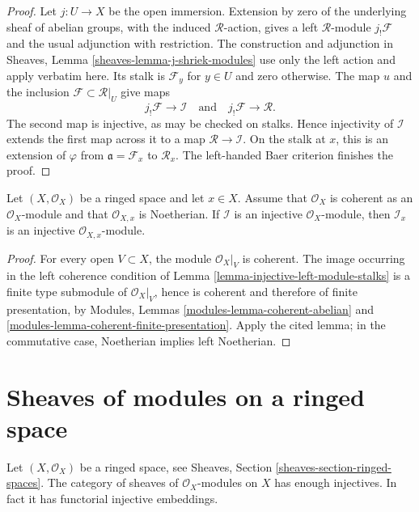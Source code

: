 \begin{proof}
Let $j : U \to X$ be the open immersion. Extension by zero of the underlying
sheaf of abelian groups, with the induced $\mathcal{R}$-action, gives a left
$\mathcal{R}$-module $j_!\mathcal{F}$ and the usual adjunction with
restriction. The construction and adjunction in Sheaves, Lemma
\ref{sheaves-lemma-j-shriek-modules} use only the left action and apply
verbatim here. Its stalk is $\mathcal{F}_y$ for $y \in U$ and zero otherwise.
The map $u$ and the inclusion $\mathcal{F} \subset \mathcal{R}|_U$ give
maps
$$
j_!\mathcal{F} \longrightarrow \mathcal{I}
\quad\text{and}\quad
j_!\mathcal{F} \longrightarrow \mathcal{R}.
$$
The second map is injective, as may be checked on stalks. Hence injectivity
of $\mathcal{I}$ extends the first map across it to a map
$\mathcal{R} \to \mathcal{I}$. On the stalk at $x$, this is an extension of
$\varphi$ from $\mathfrak a=\mathcal{F}_x$ to $\mathcal{R}_x$. The
left-handed Baer criterion finishes the proof.
\end{proof}

\begin{lemma}
\label{lemma-injective-module-stalks}
Let $(X, \mathcal{O}_X)$ be a ringed space and let $x \in X$.
Assume that $\mathcal{O}_X$ is coherent as an $\mathcal{O}_X$-module
and that $\mathcal{O}_{X, x}$ is Noetherian.
If $\mathcal{I}$ is an injective $\mathcal{O}_X$-module, then
$\mathcal{I}_x$ is an injective $\mathcal{O}_{X, x}$-module.
\end{lemma}

\begin{proof}
For every open $V \subset X$, the module $\mathcal{O}_X|_V$ is coherent. The
image occurring in the left coherence condition of Lemma
\ref{lemma-injective-left-module-stalks} is a finite type submodule of
$\mathcal{O}_X|_V$, hence is coherent and therefore of finite presentation,
by Modules, Lemmas \ref{modules-lemma-coherent-abelian} and
\ref{modules-lemma-coherent-finite-presentation}. Apply the cited lemma; in
the commutative case, Noetherian implies left Noetherian.
\end{proof}


\section{Sheaves of modules on a ringed space}
\label{section-sheaves-modules-space}

\begin{lemma}
\label{lemma-sheaves-modules-space}
Let $(X, \mathcal{O}_X)$ be a ringed space, see
Sheaves, Section \ref{sheaves-section-ringed-spaces}.
The category of sheaves of $\mathcal{O}_X$-modules on $X$
has enough injectives. In fact it has functorial injective embeddings.
\end{lemma}

